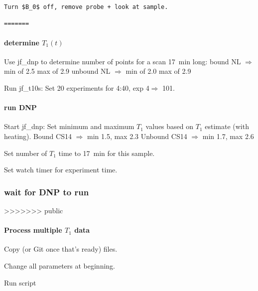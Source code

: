 \begin{scriptsize}
\begin{python}[off]
\begin{scriptsize}
\begin{lstlisting}
Turn $B_0$ off, remove probe + look at sample.

=======
\end{lstlisting}
\end{scriptsize}

\paragraph{determine $T_1(t)$}
Use jf\_dnp to determine number of points for a scan 17~min long:
bound NL $\Rightarrow$ min of 2.5 max of 2.9
unbound NL $\Rightarrow$ min of 2.0 max of 2.9

Run jf\_t10s:
Set 20 experiments for 4:40, exp 4$\Rightarrow$ 101.

\paragraph{run DNP}
Start jf\_dnp: Set minimum and maximum $T_1$ values based on $T_1$ estimate (with heating).
Bound CS14 $\Rightarrow$ min 1.5, max 2.3
Unbound CS14 $\Rightarrow$ min 1.7, max 2.6

Set number of $T_1$ time to 17~min for this sample.

Set watch timer for experiment time.

\subsubsection{wait for DNP to run}

>>>>>>> public
\paragraph{Process multiple $T_1$ data}
Copy (or Git once that's ready) files.

Change all parameters at beginning.

Run script


\end{python}
\end{scriptsize}

